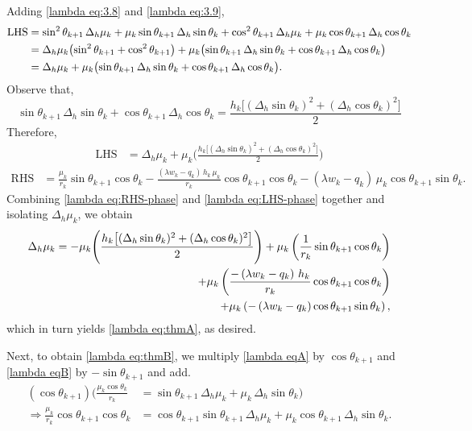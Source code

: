 \documentclass[12pt,reqno]{amsart}
\numberwithin{equation}{section}
\begin{document}
Adding \eqref{lambda eq:3.8} and \eqref{lambda eq:3.9},
\begin{align*}
\text{LHS}
&= \sin^2\theta_{k+1}\,\Delta_h\mu_k
+ \mu_k\sin\theta_{k+1}\,\Delta_h\sin\theta_k
+\cos^2\theta_{k+1}\,\Delta_h\mu_k
+ \mu_k\cos\theta_{k+1}\,\Delta_h\cos\theta_k\\
&= \Delta_h\mu_k\bigl(\sin^2\theta_{k+1} + \cos^2\theta_{k+1}\bigr)
+ \mu_k\bigl(\sin\theta_{k+1}\,\Delta_h\sin\theta_k
+ \cos\theta_{k+1}\,\Delta_h\cos\theta_k\bigr) \notag\\
&= \Delta_h\mu_k
+ \mu_k\bigl(\sin\theta_{k+1}\,\Delta_h\sin\theta_k
+ \cos\theta_{k+1}\,\Delta_h\cos\theta_k\bigr).
\end{align*}
Observe that,
\begin{equation}
\label{lambda eq:trig-identity}
\sin\theta_{k+1}\,\Delta_h\sin\theta_k
+ \cos\theta_{k+1}\,\Delta_h\cos\theta_k
= \frac{h_k\bigl[(\Delta_h\sin\theta_k)^2 + (\Delta_h\cos\theta_k)^2\bigr]}{2}
\end{equation}
Therefore,
\begin{align}
\label{lambda eq:LHS-phase}
\text{LHS} &= \Delta_h\mu_k + \mu_k\Bigg(\frac{h_k\bigl[(\Delta_h\sin\theta_k)^2 + (\Delta_h\cos\theta_k)^2\bigr]}{2}\Bigg)
\end{align}
\begin{align}
\label{lambda eq:RHS-phase}
\text{RHS} &= \frac{\mu_k}{r_k}\sin\theta_{k+1}\cos\theta_k-\frac{\left(\lambda w_k-q_k\right)\, h_k\, \mu_k}{r_k}\cos\theta_{k+1}\cos\theta_{k}
- \left(\lambda w_k-q_k\right)\,\mu_k\cos\theta_{k+1}\sin\theta_k.
\end{align}
Combining \eqref{lambda eq:RHS-phase} and \eqref{lambda eq:LHS-phase} together and isolating $\Delta_h\mu_k$, we obtain 
\begin{align}
\Delta_h\mu_k = -\mu_k\Bigg(\frac{h_k\bigl[(\Delta_h\sin\theta_k)^2 + (\Delta_h\cos\theta_k)^2\bigr]}{2}\Bigg)+\mu_k\left(\frac{1}{r_k}\sin\theta_{k+1}\cos\theta_k\right)\notag\\
+
\mu_k\left(\frac{-\left(\lambda w_k-q_k\right)\, h_k}{r_k}\cos\theta_{k+1}\cos\theta_{k}\right) \notag \\
+\mu_k\left(- \left(\lambda w_k-q_k\right)\cos\theta_{k+1}\sin\theta_k\right),
\end{align}
which in turn yields \eqref{lambda eq:thmA}, as desired.

Next, to obtain \eqref{lambda eq:thmB}, we multiply \eqref{lambda eqA} by $\cos\theta_{k+1}$ and
\eqref{lambda eqB} by $-\sin\theta_{k+1}$ and add.
\begin{align}
    (\cos\theta_{k+1})\bigg(\frac{\mu_k\cos\theta_k}{r_k}
&= \sin\theta_{k+1}\,\Delta_h\mu_k + \mu_k\,\Delta_h\sin\theta_k\bigg)\\
\Rightarrow \frac{\mu_k}{r_k}\cos\theta_{k+1}\cos\theta_k
&= \cos\theta_{k+1}\sin\theta_{k+1}\,\Delta_h\mu_k
+ \mu_k\cos\theta_{k+1}\,\Delta_h\sin\theta_k .
\label{lambda eq:3.16}
\end{align}
\end{document}
